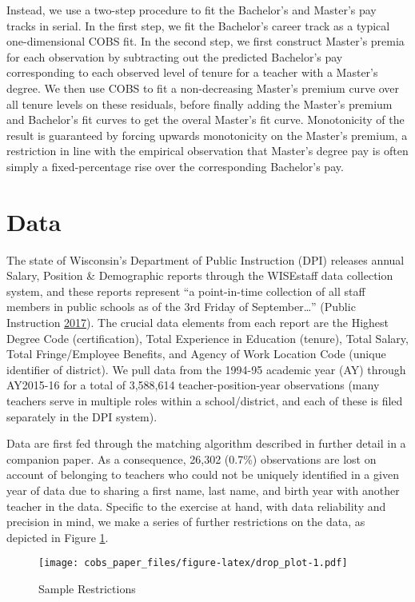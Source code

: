 \documentclass[]{article}
\begin{document}
Instead, we use a two-step procedure to fit the Bachelor's and Master's
pay tracks in serial. In the first step, we fit the Bachelor's career
track as a typical one-dimensional COBS fit. In the second step, we
first construct Master's premia for each observation by subtracting out
the predicted Bachelor's pay corresponding to each observed level of
tenure for a teacher with a Master's degree. We then use COBS to fit a
non-decreasing Master's premium curve over all tenure levels on these
residuals, before finally adding the Master's premium and Bachelor's fit
curves to get the overal Master's fit curve. Monotonicity of the result
is guaranteed by forcing upwards monotonicity on the Master's premium, a
restriction in line with the empirical observation that Master's degree
pay is often simply a fixed-percentage rise over the corresponding
Bachelor's pay.

\section{Data}\label{data}

The state of Wisconsin's Department of Public Instruction (DPI) releases
annual Salary, Position \& Demographic reports through the WISEstaff
data collection system, and these reports represent ``a point-in-time
collection of all staff members in public schools as of the 3rd Friday
of September\ldots{}'' (Public Instruction
\protect\hyperlink{ref-dpi}{2017}). The crucial data elements from each
report are the Highest Degree Code (certification), Total Experience in
Education (tenure), Total Salary, Total Fringe/Employee Benefits, and
Agency of Work Location Code (unique identifier of district). We pull
data from the 1994-95 academic year (AY) through AY2015-16 for a total
of 3,588,614 teacher-position-year observations (many teachers serve in
multiple roles within a school/district, and each of these is filed
separately in the DPI system).

Data are first fed through the matching algorithm described in further
detail in a companion paper. As a consequence, 26,302 (0.7\%)
observations are lost on account of belonging to teachers who could not
be uniquely identified in a given year of data due to sharing a first
name, last name, and birth year with another teacher in the data.
Specific to the exercise at hand, with data reliability and precision in
mind, we make a series of further restrictions on the data, as depicted
in Figure \ref{fig:samp_res}.

\begin{figure}[htbp]
\centering
\texttt{[image: cobs\_paper\_files/figure-latex/drop\_plot-1.pdf]}
\caption{\label{fig:samp_res}Sample Restrictions}
\end{figure}
\end{document}
